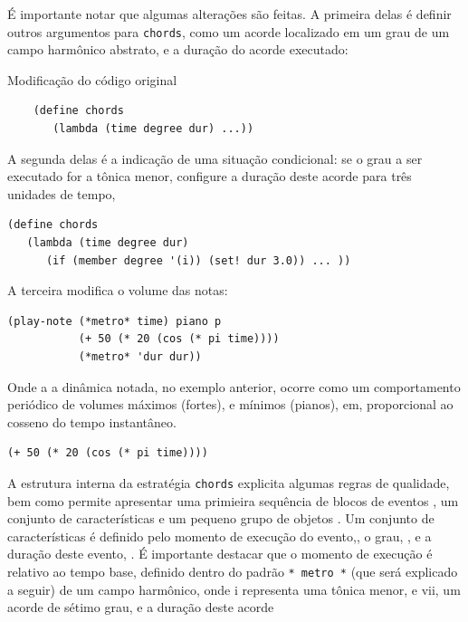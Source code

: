  É importante notar que algumas alterações são feitas. A primeira delas é definir outros argumentos para \verb|chords|, como um acorde localizado em um grau de um campo harmônico abstrato, e a duração do acorde executado:

\begin{example}{Modificação do código original}
\begin{verbatim}
    (define chords
       (lambda (time degree dur) ...))
\end{verbatim}

A segunda delas é a indicação de uma situação condicional: se o grau a ser executado for a tônica menor, configure a duração deste acorde para três unidades de tempo,

\begin{verbatim}
(define chords
   (lambda (time degree dur)
      (if (member degree '(i)) (set! dur 3.0)) ... ))
\end{verbatim}

A terceira modifica o volume das notas:

\begin{verbatim}
(play-note (*metro* time) piano p
           (+ 50 (* 20 (cos (* pi time))))
           (*metro* 'dur dur))
\end{verbatim}

Onde a a dinâmica notada, no exemplo anterior, ocorre como um comportamento periódico de volumes máximos (fortes), e mínimos (pianos), em, proporcional ao cosseno do tempo instantâneo. 

\begin{verbatim}
(+ 50 (* 20 (cos (* pi time))))
\end{verbatim}
\end{example}

A estrutura interna da estratégia \verb|chords| explicita algumas regras de qualidade, bem como permite apresentar uma primieira sequência de blocos de eventos , um conjunto de características  e um pequeno grupo de objetos . Um conjunto de características é definido pelo momento de execução do evento,, o grau, , e a duração deste evento, . É importante destacar que o momento de execução é relativo ao tempo base, definido dentro do padrão \verb|* metro *| (que será explicado a seguir) de um campo harmônico, onde i representa uma tônica menor, e vii, um acorde de sétimo grau, e a duração deste acorde

